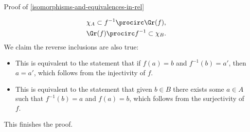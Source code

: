\begin{Proof}{Proof of \cref{isomorphisms-and-equivalences-in-rel}}
\begin{itemize}
            \begin{gather*}
                \chi_{A}              \subset f^{-1}\procirc\Gr(f),\\
                \Gr(f)\procirc f^{-1} \subset \chi_{B}.
            \end{gather*}
            We claim the reverse inclusions are also true:
            \begin{itemize}
                \item{}This is equivalent to the statement that if $f(a)=b$ and $f^{-1}(b)=a'$, then $a=a'$, which follows from the injectivity of $f$.
                \item{}This is equivalent to the statement that given $b\in B$ there exists some $a\in A$ such that $f^{-1}(b)=a$ and $f(a)=b$, which follows from the surjectivity of $f$.
            \end{itemize}
    \end{itemize}
    This finishes the proof.
\end{Proof}
